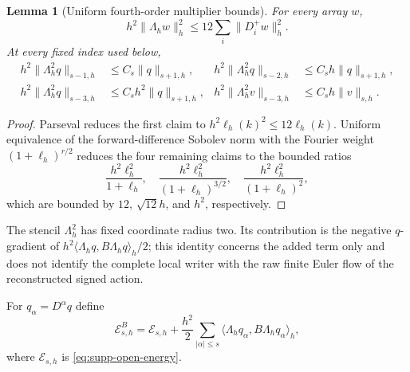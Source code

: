 \documentclass[11pt]{article}
\newtheorem{lemma}[lemma]{Lemma}
\theoremstyle{definition}
\theoremstyle{remark}
\begin{document}
\begin{lemma}[Uniform fourth-order multiplier bounds]
\label{lem:supp-law-multiplier}
For every array $w$,
\begin{equation}
 h^2\|\Lambda_hw\|_h^2\le12\sum_i\|D_i^+w\|_h^2.
 \label{eq:supp-law-domination}
\end{equation}
At every fixed index used below,
\begin{align}
 h^2\|\Lambda_h^2q\|_{s-1,h}&\le C_s\|q\|_{s+1,h},&
 h^2\|\Lambda_h^2q\|_{s-2,h}&\le C_sh\|q\|_{s+1,h},\\
 h^2\|\Lambda_h^2q\|_{s-3,h}&\le C_sh^2\|q\|_{s+1,h},&
 h^2\|\Lambda_h^2v\|_{s-3,h}&\le C_sh\|v\|_{s,h}.
 \label{eq:supp-law-orders}
\end{align}
\end{lemma}
\begin{proof}
Parseval reduces the first claim to
$h^2\ell_h(k)^2\le12\ell_h(k)$.  Uniform equivalence of the forward-difference
Sobolev norm with the Fourier weight $(1+\ell_h)^{r/2}$ reduces the four
remaining claims to the bounded ratios
\[
 \frac{h^2\ell_h^2}{1+\ell_h},\quad
 \frac{h^2\ell_h^2}{(1+\ell_h)^{3/2}},\quad
 \frac{h^2\ell_h^2}{(1+\ell_h)^2},
\]
which are bounded by $12$, $\sqrt{12}h$, and $h^2$, respectively.
\end{proof}

The stencil $\Lambda_h^2$ has fixed coordinate radius two.  Its contribution
is the negative $q$-gradient of
$h^2\langle\Lambda_hq,B\Lambda_hq\rangle_h/2$; this identity concerns the
added term only and does not identify the complete local writer with the raw
finite Euler flow of the reconstructed signed action.

For $q_\alpha=D^\alpha q$ define
\begin{equation}
 \boxed{\mathscr E^B_{s,h}=\mathscr E_{s,h}
   +\frac{h^2}{2}\sum_{|\alpha|\le s}
       \langle\Lambda_hq_\alpha,B\Lambda_hq_\alpha\rangle_h,}
 \label{eq:supp-law-energy}
\end{equation}
where $\mathscr E_{s,h}$ is \eqref{eq:supp-open-energy}.
\end{document}
